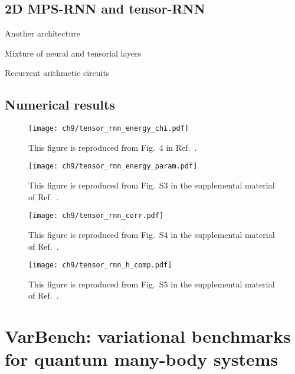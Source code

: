 \section{2D MPS-RNN and tensor-RNN}

Another architecture~\cite{hibat2021variational, hibat2022supplementing}

Mixture of neural and tensorial layers~\cite{chen2023antn}

Recurrent arithmetic circuits~\cite{levine2017long, levine2019quantum}

\section{Numerical results}

\begin{figure}[htb]
\centering
\texttt{[image: ch9/tensor\_rnn\_energy\_chi.pdf]}
\caption[Variational energy vs. bond dimension for tensor-RNN]{
This figure is reproduced from Fig.~4 in Ref.~\cite{wu2023tensor}.
}
\label{fig:tensor-rnn-energy-chi}
\end{figure}

\begin{figure}[htb]
\centering
\texttt{[image: ch9/tensor\_rnn\_energy\_param.pdf]}
\caption[Variational energy vs. number of parameters for tensor-RNN]{
This figure is reproduced from Fig.~S3 in the supplemental material of Ref.~\cite{wu2023tensor}.
}
\label{fig:tensor-rnn-energy-param}
\end{figure}

\begin{figure}[htb]
\centering
\texttt{[image: ch9/tensor\_rnn\_corr.pdf]}
\caption[Spin correlations in MPS-RNN]{
This figure is reproduced from Fig.~S4 in the supplemental material of Ref.~\cite{wu2023tensor}.
}
\label{fig:tensor-rnn-corr}
\end{figure}

\begin{figure}[htb]
\centering
\texttt{[image: ch9/tensor\_rnn\_h\_comp.pdf]}
\caption[Magnitudes of tensor, matrix, and vector terms in tensor-RNN]{
This figure is reproduced from Fig.~S5 in the supplemental material of Ref.~\cite{wu2023tensor}.
}
\label{fig:tensor-rnn-h-comp}
\end{figure}

\chapter{VarBench: variational benchmarks for quantum many-body systems}
\label{ch:varbench}
